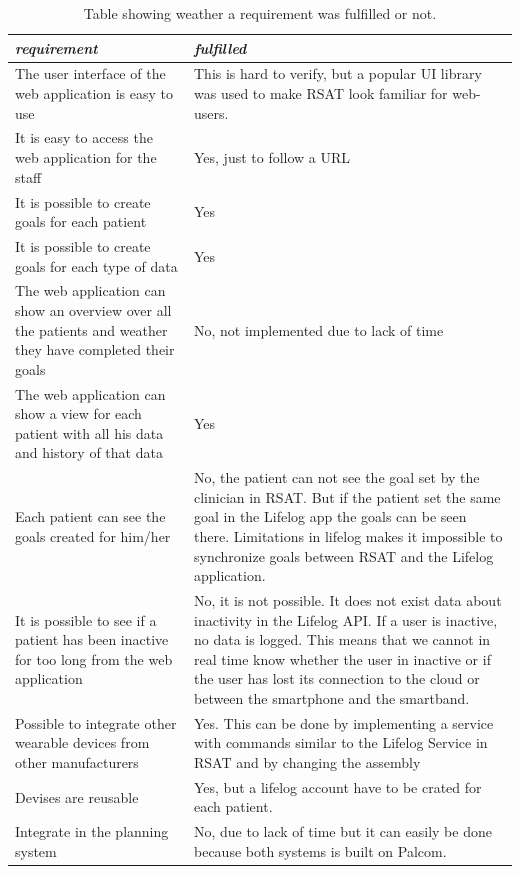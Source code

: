 \documentclass{cslthse-msc}
\begin{document}
\renewcommand{\arraystretch}{1.2}
\begin{table}[H]
\centering
\begin{tabular}{p{}|p{}}
\emph{requirement} &  \emph{fulfilled}\\ \hline
The user interface of the web application is easy to use &  This is hard to verify, but a popular UI library was used to make RSAT look familiar for web-users. \\
It is easy to access the web application for the staff & Yes, just to follow a URL \\
It is possible to create goals for each patient & Yes \\
It is  possible to create goals for each type of data & Yes \\
The web application can show an overview over all the patients and weather they have completed their goals & No, not implemented due to lack of time \\
The web application can show a view for each patient with all his data and history of that data & Yes \\
Each patient can see the goals created for him/her & No, the patient can not see the goal set by the clinician in RSAT. But if the patient set the same goal in the Lifelog app the goals can be seen there. Limitations in lifelog makes it impossible to synchronize goals between RSAT and the Lifelog application. \\
It is possible to see if a patient has been inactive for too long from the web application & No, it is not possible. It does not exist data about inactivity in the Lifelog API. If a user is inactive, no data is logged. This means that we cannot in real time know whether the user in inactive or if the user has lost its connection to the cloud or between the smartphone and the smartband. \\
Possible to integrate other wearable devices from other manufacturers & Yes. This can be done by implementing a service with commands similar to the Lifelog Service in RSAT and by changing the assembly \\
Devises are reusable & Yes, but a lifelog account have to be crated for each patient. \\
Integrate in the planning system & No, due to lack of time but it can easily be done because both systems is built on Palcom.
\end{tabular}
\caption{Table showing weather a requirement was fulfilled or not.}
\label{tab:requerment_fullfillment}
\end{table}
\end{document}
